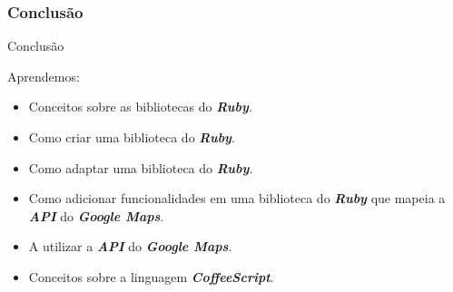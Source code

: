 \begin{frame}
 \frametitle{Conclusão}

  \begin{block}{Conclusão}

   Aprendemos:

   \begin{itemize}

    \item Conceitos sobre as bibliotecas do \emph{\textbf{Ruby}}.

    \item Como criar uma biblioteca do \emph{\textbf{Ruby}}.

    \item Como adaptar uma biblioteca do \emph{\textbf{Ruby}}.

    \item Como adicionar funcionalidades em uma biblioteca do \emph{\textbf{Ruby}} que mapeia a
    \emph{\textbf{API}} do \emph{\textbf{Google Maps}}.

    \item A utilizar a \emph{\textbf{API}} do \emph{\textbf{Google Maps}}.

    \item Conceitos sobre a linguagem \emph{\textbf{CoffeeScript}}.

   \end{itemize}

  \end{block}

\end{frame}
